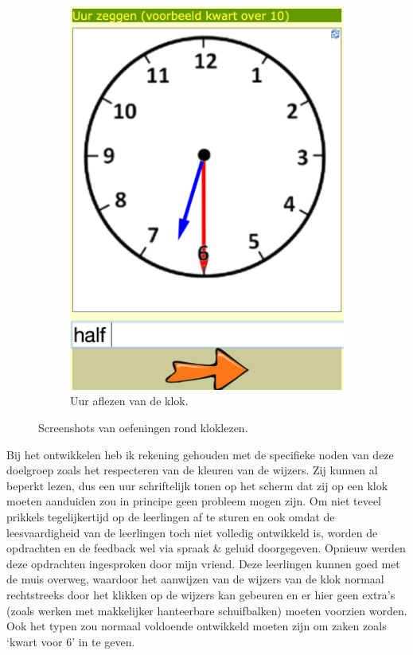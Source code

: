 \documentclass[a4paper,11pt]{article}
\theoremstyle{definition}
\begin{document}
\begin{figure}[h!]
\begin{subfigure}{.5\textwidth}
                \includegraphics[scale=0.15]{klok2.jpg}
                \caption{Uur aflezen van de klok.}
                \label{klok2}
        \end{subfigure}
           \caption{Screenshots van oefeningen rond kloklezen.}
\end{figure}

\noindent Bij het ontwikkelen heb ik rekening gehouden met de specifieke noden 
van deze doelgroep zoals het respecteren van de kleuren van de wijzers. Zij 
kunnen al beperkt lezen, dus een uur schriftelijk tonen op het scherm dat zij op 
een klok moeten aanduiden zou in principe geen probleem mogen zijn. Om niet 
teveel prikkels tegelijkertijd op de leerlingen af te sturen en ook omdat de leesvaardigheid van de leerlingen toch niet volledig ontwikkeld is, worden de 
opdrachten en de feedback wel via spraak \& geluid doorgegeven. Opnieuw werden deze opdrachten ingesproken door mijn vriend. Deze leerlingen 
kunnen goed met de muis overweg, waardoor het aanwijzen van de wijzers van de 
klok normaal rechtstreeks door het klikken op de wijzers kan gebeuren en er hier 
geen extra's (zoals werken met makkelijker hanteerbare schuifbalken) moeten voorzien worden. 
Ook het typen zou normaal voldoende ontwikkeld moeten zijn om zaken zoals `kwart 
voor 6' in te geven.\\
 
\end{document}
